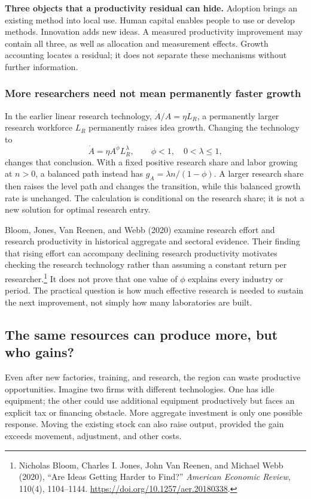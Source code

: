 \begin{greenblock}
\textbf{Three objects that a productivity residual can hide.}
Adoption brings an existing method into local use. Human capital enables
people to use or develop methods. Innovation adds new ideas. A measured
productivity improvement may contain all three, as well as allocation and
measurement effects. Growth accounting locates a residual; it does not
separate these mechanisms without further information.
\end{greenblock}

\subsubsection{More researchers need not mean permanently faster growth}

In the earlier linear research technology, $\dot A/A=\eta L_R$, a
permanently larger research workforce $L_R$ permanently raises idea growth.
Changing the technology to
\[
\dot A=\eta A^\phi L_R^\lambda,
\qquad \phi<1,\quad0<\lambda\leq1,
\]
changes that conclusion. With a fixed positive research share and labor
growing at $n>0$, a balanced path instead has
$g_A=\lambda n/(1-\phi)$. A larger research share then raises the level
path and changes the transition, while this balanced growth rate is unchanged.
The calculation is conditional on the research share; it is not a new
solution for optimal research entry.

Bloom, Jones, Van Reenen, and Webb (2020) examine research effort and
research productivity in historical aggregate and sectoral evidence. Their
finding that rising effort can accompany declining research productivity
motivates checking the research technology rather than assuming a constant
return per researcher.\footnote{Nicholas Bloom, Charles I. Jones, John
Van Reenen, and Michael Webb (2020), ``Are Ideas Getting Harder to Find?''
\textit{American Economic Review}, 110(4), 1104--1144.
\url{https://doi.org/10.1257/aer.20180338}.}
It does not prove that one value of $\phi$ explains every industry or period.
The practical question is how much effective research is needed to sustain
the next improvement, not simply how many laboratories are built.

\subsection{The same resources can produce more, but who gains?}

Even after new factories, training, and research, the region can waste
productive opportunities. Imagine two firms with different technologies.
One has idle equipment; the other could use additional equipment productively
but faces an explicit tax or financing obstacle. More aggregate investment
is only one possible response. Moving the existing stock can also raise
output, provided the gain exceeds movement, adjustment, and other costs.

